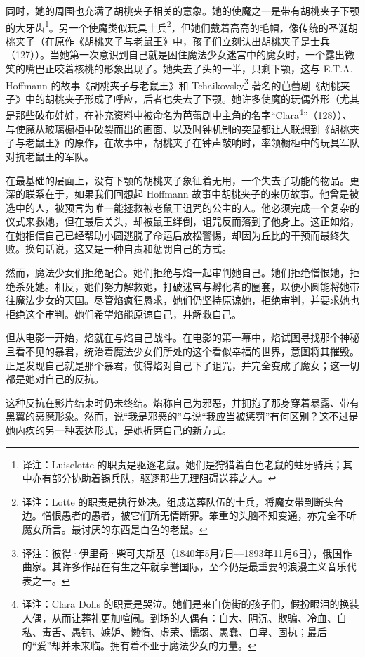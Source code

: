 同时，她的周围也充满了胡桃夹子相关的意象。她的使魔之一是带有胡桃夹子下颚的大牙齿\footnote{译注：Luiselotte 的职责是驱逐老鼠。她们是狩猎着白色老鼠的蛀牙骑兵；其中亦有部分协助着锡兵队，驱逐那些无理阻碍送葬之人。}。另一个使魔类似玩具士兵\footnote{译注：Lotte 的职责是执行处决。组成送葬队伍的士兵，将魔女带到断头台边。憎恨愚者的愚者，被它们所无情断罪。笨重的头脑不知变通，亦完全不听魔女所言。最讨厌的东西是白色的老鼠。}，但她们戴着高高的毛帽，像传统的圣诞胡桃夹子（在原作《胡桃夹子与老鼠王》中，孩子们立刻认出胡桃夹子是士兵（127））。当她第一次意识到自己就是困住魔法少女迷宫中的魔女时，一个露出微笑的嘴巴正咬着核桃的形象出现了。她失去了头的一半，只剩下颚，这与 E.T.A. Hoffmann 的故事《胡桃夹子与老鼠王》和 Tchaikovsky\footnote{译注：彼得·伊里奇·柴可夫斯基（1840年5月7日—1893年11月6日），俄国作曲家。其许多作品在有生之年就享誉国际，至今仍是最重要的浪漫主义音乐代表之一。} 著名的芭蕾剧《胡桃夹子》中的胡桃夹子形成了呼应，后者也失去了下颚。她许多使魔的玩偶外形（尤其是那些破布娃娃，在补充资料中被命名为芭蕾剧中主角的名字“Clara\footnote{译注：Clara Dolls 的职责是哭泣。她们是来自伪街的孩子们，假扮眼泪的换装人偶，从而让葬礼更加喧闹。到场的人偶有：自大、阴沉、欺骗、冷血、自私、毒舌、愚钝、嫉妒、懒惰、虚荣、懦弱、愚蠢、自卑、固执；最后的“爱”却并未来临。拥有着不亚于魔法少女的力量。}”（128））、与使魔从玻璃橱柜中破裂而出的画面、以及时钟机制的突显都让人联想到《胡桃夹子与老鼠王》的原作，在故事中，胡桃夹子在钟声敲响时，率领橱柜中的玩具军队对抗老鼠王的军队。

在最基础的层面上，没有下颚的胡桃夹子象征着无用，一个失去了功能的物品。更深的联系在于，如果我们回想起 Hoffmann 故事中胡桃夹子的来历故事。他曾是被选中的人，被预言为唯一能拯救被老鼠王诅咒的公主的人。他必须完成一个复杂的仪式来救她，但在最后关头，却被鼠王绊倒，诅咒反而落到了他身上。这正如焰，在她相信自己已经帮助小圆逃脱了命运后放松警惕，却因为丘比的干预而最终失败。换句话说，这又是一种自责和惩罚自己的方式。

然而，魔法少女们拒绝配合。她们拒绝与焰一起审判她自己。她们拒绝憎恨她，拒绝杀死她。相反，她们努力解救她，打破迷宫与孵化者的圈套，以便小圆能将她带往魔法少女的天国。尽管焰疯狂恳求，她们仍坚持原谅她，拒绝审判，并要求她也拒绝这个审判。她们希望焰能原谅自己，并解救自己。

但从电影一开始，焰就在与焰自己战斗。在电影的第一幕中，焰试图寻找那个神秘且看不见的暴君，统治着魔法少女们所处的这个看似幸福的世界，意图将其摧毁。正是发现自己就是那个暴君，使得焰对自己下了诅咒，并完全变成了魔女；这一切都是她对自己的反抗。

这种反抗在影片结束时仍未终结。焰称自己为邪恶，并拥抱了那身穿着暴露、带有黑翼的恶魔形象。然而，说“我是邪恶的”与说“我应当被惩罚”有何区别？这不过是她内疚的另一种表达形式，是她折磨自己的新方式。

